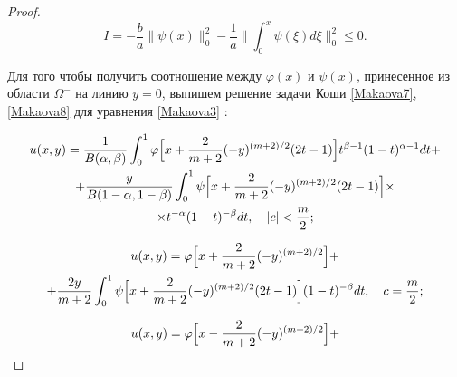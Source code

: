 \begin{proof}
\begin{equation}
\label{Makaova18}

I=

-\frac{b}{a}\|\psi(x)\|^2_0 -\frac{1}{a} \biggl\| \int _0^x \psi(\xi) d \xi \biggr\|^2_0\leq 0.

\end{equation}



Для того чтобы получить соотношение между $\varphi(x)$ и $\psi (x)$, принесенное из области $\Omega^-$ на линию $y=0$, выпишем решение задачи Коши \eqref{Makaova7}, \eqref{Makaova8} для уравнения \eqref{Makaova3} \cite{Smirnov_2}:

\begin{multline} 

u(x,y)=\frac{1}{B(\alpha, \beta)}\int _0^1 

\varphi \Bigl[ x+\frac{2}{m+2}(-y)^{({m+2})/{2}}(2t-1)\Bigr] t^{\beta-1} (1-t)^{\alpha-1}dt+

\\

\label{Makaova19}

+\frac{y}{B(1-\alpha,1- \beta)} \int _0^1 

\psi \Bigl[ x+\frac{2}{m+2}(-y)^{({m+2})/{2}}(2t-1)\Bigr] \times \\

\times t^{-\alpha} (1-t)^{-\beta}dt, \quad  |c|<\frac{m}{2};

\end{multline}

\begin{multline} 

u(x,y)=\varphi \Bigl[ x+\frac{2}{m+2}(-y)^{({m+2})/{2}}\Bigr]+

\\

\label{Makaova21} 

+\frac{2y}{m+2}

\int _0^1 

\psi \Bigl[ 

x+\frac{2}{m+2}(-y)^{({m+2})/{2}}(2t-1)

\Bigr]

(1-t)^{-\beta}dt, \quad  c=\frac{m}{2};

\end{multline}

\begin{multline} 

u(x,y)=\varphi \Bigl[ x-\frac{2}{m+2}(-y)^{({m+2})/{2}}

\Bigr]+


\end{multline}
\end{proof}
